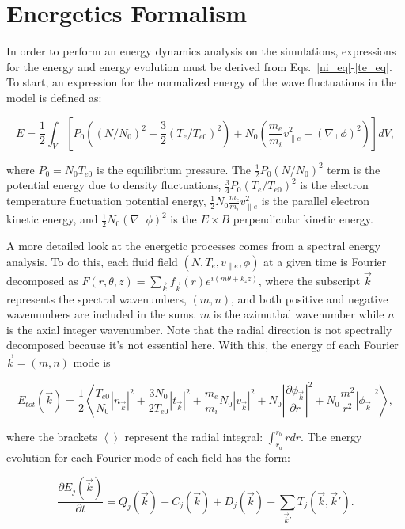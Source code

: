 \documentclass[showpacs,preprintnumbers,amsmath,amssymb,superscriptaddress,aip]{revtex4-1}
\def\beq{\begin{equation}}
\def\eeq{\end{equation}}
\newcommand{\pdiff}[2]{\frac{\partial#1}{\partial#2}}
\def\grad{\nabla}
\newcommand{\gradperp}{\grad_\perp}
\newcommand{\vpe}{v_{\parallel e}}
\begin{document}
\section{Energetics Formalism}
\label{sec_energetics_machinery}

In order to perform an energy dynamics analysis on the simulations, expressions for the energy and energy evolution must be derived from Eqs.~\ref{ni_eq}-\ref{te_eq}.
To start, an expression for the normalized energy of the wave fluctuations in the model is defined as:

\beq
\label{energy_eq}
E = \frac{1}{2} \int_V  \left[ P_0 \left((N/N_0)^2 + \frac{3}{2} (T_e/T_{e0})^2 \right) + N_0 \left( \frac{m_e}{m_i} \vpe^2 + (\gradperp \phi)^2 \right) \right] dV,
\eeq

where $P_0 = N_0 T_{e0}$ is the equilibrium pressure.
The $\frac{1}{2} P_0 (N/N_0)^2$ term is the potential energy due to density fluctuations, $\frac{3}{4} P_0 (T_e/T_{e0})^2$ is the electron temperature fluctuation potential energy,
$\frac{1}{2} N_0 \frac{m_e}{m_i} \vpe^2$ is the parallel electron kinetic energy, and $\frac{1}{2} N_0 (\gradperp \phi)^2$ is the $E \times B$ perpendicular kinetic energy.

A more detailed look at the energetic processes comes from a spectral energy analysis. To do this, each fluid field $(N,T_e,\vpe,\phi)$ at a given time is Fourier decomposed as 
$F(r,\theta,z) = \sum_{\vec{k}} f_{\vec{k}}(r) e^{i (m \theta + k_z z )}$,
where the subscript $\vec{k}$ represents the spectral wavenumbers, $(m,n)$, and both positive and negative wavenumbers are included in the sums. 
$m$ is the azimuthal wavenumber while $n$ is the axial integer wavenumber. 
Note that the radial direction is not spectrally decomposed because it's not essential here.
With this, the energy of each Fourier $\vec{k} = (m,n)$ mode is

\beq
\label{E_k}
E_{tot}(\vec{k}) = \frac{1}{2} \left< \frac{T_{e0}}{N_0} |n_{\vec{k}}|^2 + \frac{3 N_0}{2 T_{e0}} |t_{\vec{k}}|^2 + \frac{m_e}{m_i} N_0 |v_{\vec{k}}|^2 + N_0 \left| \pdiff{\phi_{\vec{k}}}{r} \right|^2 + N_0 \frac{m^2}{r^2} |\phi_{\vec{k}}|^2 \right>,
\eeq

where the brackets $\left< \right>$ represent the radial integral: $\int_{r_a}^{r_b} r dr$. 
The energy evolution for each Fourier mode of each field has the form:

\beq
\label{dEdt_j}
\pdiff{E_{j}(\vec{k})}{t} = Q_{j}(\vec{k}) + C_{j}(\vec{k}) + D_j(\vec{k}) + \sum_{\vec{k}'} T_{j}(\vec{k},\vec{k}').
\eeq
\end{document}
